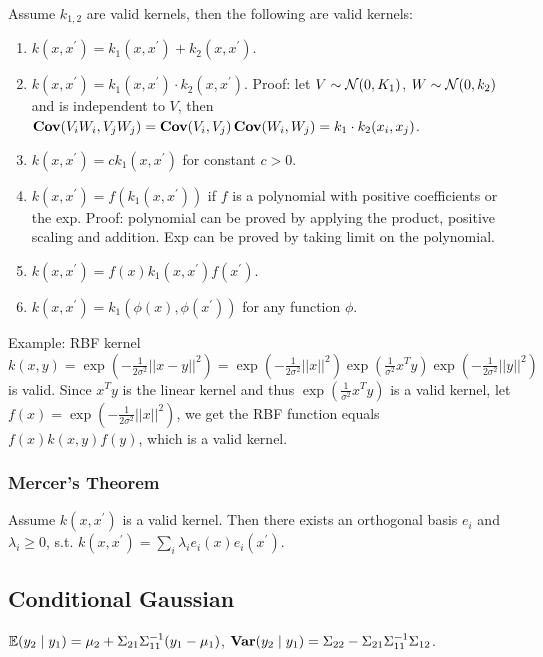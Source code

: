 Assume $k_{1,2}$ are valid kernels, then the following are valid kernels:
\begin{enumerate}
    \item $k(x, x^\prime) = k_1(x, x^\prime) + k_2(x, x^\prime)$.
    \item $k(x, x^\prime) = k_1(x, x^\prime)\cdot k_2(x, x^\prime)$. Proof: let $V\sim \mathcal{N}(0, K_1)$, $W\sim \mathcal{N}(0, k_2)$ and is independent to $V$, then $\operatorname{\textbf{Cov}}(V_i W_i, V_j W_j) = \operatorname{\textbf{Cov}}(V_i, V_j)\operatorname{\textbf{Cov}}(W_i, W_j) = k_1\cdot k_2(x_i, x_j)$.
    \item $k(x, x^\prime) = c k_1(x, x^\prime)$ for constant $c>0$.
    \item $k(x, x^\prime) = f(k_1(x, x^\prime))$ if $f$ is a polynomial with positive coefficients or the exp. Proof: polynomial can be proved by applying the product, positive scaling and addition. Exp can be proved by taking limit on the polynomial.
    \item $k(x, x^\prime) = f(x) k_1(x, x^\prime) f(x^\prime)$.
    \item $k(x, x^\prime) = k_1(\phi(x), \phi(x^\prime))$ for any function $\phi$.
\end{enumerate}

Example: RBF kernel $k(x,y) = \exp(-\frac{1}{2\sigma^2}||x-y||^2) = \exp(-\frac{1}{2\sigma^2} ||x||^2) \exp(\frac{1}{\sigma^2}x^T y) \exp(-\frac{1}{2\sigma^2} ||y||^2)$ is valid. Since $x^T y$ is the linear kernel and thus $\exp(\frac{1}{\sigma^2}x^T y)$ is a valid kernel, let $f(x) = \exp(-\frac{1}{2\sigma^2} ||x||^2)$, we get the RBF function equals $f(x) k(x, y) f(y)$, which is a valid kernel.

\subsubsection*{Mercer's Theorem}
Assume $k(x, x^\prime)$ is a valid kernel. Then there exists an orthogonal basis $e_i$ and $\lambda_i\ge 0$, s.t. $k(x, x^\prime) = \sum_{i} \lambda_i e_i(x) e_i(x^\prime)$.

\subsection*{Conditional Gaussian}

$\mathbb{E} (y_2 \mid y_1) = \mu_2+\Sigma_{21}\Sigma_{11}^{-1} (y_1-\mu_1)$, $\operatorname{\textbf{Var}}(y_2\mid y_1) = \Sigma_{22} - \Sigma_{21}\Sigma_{11}^{-1}\Sigma_{12}$.